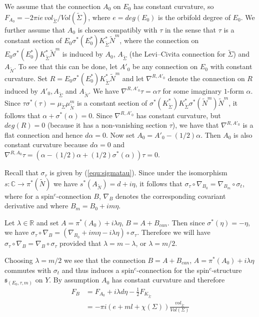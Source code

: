 \documentclass{amsart}
\theoremstyle{definition}
\theoremstyle{remark}
\numberwithin{equation}{section}
\begin{document}
We assume that the connection $A_0$ on $E_0$ has constant curvature, so $F_{A_0} = -2\pi i e \, vol_{\widetilde{\Sigma}}/Vol(\widetilde{\Sigma})$, where $e = deg(E_0)$ is the orbifold degree of $E_0$. We further assume that $A_0$ is chosen compatibly with $\tau$ in the sense that $\tau$ is a constant section of $E_0 \sigma^*(E_0^*) K_{\widetilde{\Sigma}}^* \widetilde{N}^m$, where the connection on $E_0 \sigma^*(E_0^*) K_{\widetilde{\Sigma}}^* \widetilde{N}^m$ is induced by $A_0$, $A_{\widetilde{\Sigma}}$ (the Levi--Civita connection for $\widetilde{\Sigma}$) and $A_{\widetilde{N}}$. To see that this can be done, let $A'_0$ be any connection on $E_0$ with constant curvature. Set $R = E_0 \sigma^*(E_0^*) K_{\widetilde{\Sigma}}^* \widetilde{N}^m$ and let $\nabla^{R,A'_0}$ denote the connection on $R$ induced by $A'_0, A_{\widetilde{\Sigma}}$ and $A_{\widetilde{N}}$. We have $\nabla^{R,A'_0} \tau = \alpha \tau$ for some imaginary $1$-form $\alpha$. Since $\tau \sigma^*(\tau) = \mu_{\widetilde{\Sigma}} \mu_{\widetilde{N}}^m$ is a constant section of $\sigma^*(K_{\widetilde{\Sigma}}^*)K_{\widetilde{\Sigma}}^* \sigma^*(\widetilde{N}^m)\widetilde{N}^m$, it follows that $\alpha + \sigma^*(\alpha) = 0$. Since $\nabla^{R,A'_0}$ has constant curvature, but $deg(R) = 0$ (because it has a non-vanishing section $\tau$), we have that $\nabla^{R,A'_0}$ is a flat connection and hence $d \alpha = 0$. Now set $A_0 = A'_0 - (1/2)\alpha$. Then $A_0$ is also constant curvature because $d\alpha = 0$ and $\nabla^{R,A_0}\tau = (\alpha - (1/2)\alpha + (1/2)\sigma^*(\alpha) )\tau = 0$.

Recall that $\sigma_\tau$ is given by (\ref{equ:sigmatau}). Since under the isomorphism $s \colon \mathbb{C} \to \pi^*(\widetilde{N})$ we have $s^*(A_{\widetilde{N}}) = d + i\eta$, it follows that $\sigma_\tau \circ \nabla_{B_0} = \nabla_{B_m} \circ \sigma_t$, where for a spin$^c$-connection $B$, $\nabla_B$ denotes the corresponding covariant derivative and where $B_m = B_0 + im\eta$.

Let $\lambda \in \mathbb{R}$ and set $A = \pi^*(A_0) + i\lambda \eta$, $B = A + B_{can}$. Then since $\sigma^*(\eta) = -\eta$, we have $\sigma_\tau \circ \nabla_B = (\nabla_{B_0} + im\eta - i\lambda \eta) \circ \sigma_\tau$. Therefore we will have $\sigma_\tau \circ \nabla_B = \nabla_B \circ \sigma_\tau$ provided that $\lambda = m-\lambda$, or $\lambda = m/2$.

Choosing $\lambda = m/2$ we see that the connection $B = A + B_{can}$, $A = \pi^*(A_0) + i\lambda \eta$ commutes with $\sigma_t$ and thus induces a spin$^c$-connection for the spin$^c$-structure $\mathfrak{s}_{(E_0 , \tau , m)}$ on $Y$. By assumption $A_0$ has constant curvature and therefore
\begin{align*}
F_B &= F_{A_0} + i\lambda d\eta - \frac{1}{2} F_{K_{\widetilde{\Sigma}}} \\
&= -\pi i \left( e + ml + \chi(\Sigma) \right) \frac{vol_{\widetilde{\Sigma}}}{Vol(\Sigma)}
\end{align*}
\end{document}

